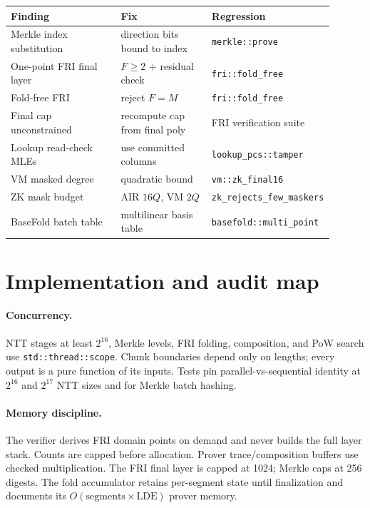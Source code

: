 \documentclass[11pt,a4paper]{article}
\begin{document}
\begin{longtable}{@{}L{0.34\linewidth}L{0.28\linewidth}L{0.28\linewidth}@{}}
\toprule
Finding & Fix & Regression \\
\midrule
\endhead
Merkle index substitution & direction bits bound to index & \texttt{merkle::prove} \\
One-point FRI final layer & $F\ge2$ + residual check & \texttt{fri::fold\_free} \\
Fold-free FRI & reject $F=M$ & \texttt{fri::fold\_free} \\
Final cap unconstrained & recompute cap from final poly & FRI verification suite \\
Lookup read-check MLEs & use committed columns & \texttt{lookup\_pcs::tamper} \\
VM masked degree & quadratic bound & \texttt{vm::zk\_final16} \\
ZK mask budget & AIR $16Q$, VM $2Q$ & \texttt{zk\_rejects\_few\_maskers} \\
BaseFold batch table & multilinear basis table & \texttt{basefold::multi\_point} \\
\bottomrule
\end{longtable}

\section{Implementation and audit map}

\paragraph{Concurrency.} NTT stages at least $2^{16}$, Merkle levels, FRI
folding, composition, and PoW search use \texttt{std::thread::scope}.
Chunk boundaries depend only on lengths; every output is a pure function of
its inputs. Tests pin parallel-vs-sequential identity at $2^{16}$ and
$2^{17}$ NTT sizes and for Merkle batch hashing.

\paragraph{Memory discipline.} The verifier derives FRI domain points on
demand and never builds the full layer stack. Counts are capped before
allocation. Prover trace/composition buffers use checked multiplication.
The FRI final layer is capped at 1024; Merkle caps at 256 digests. The fold
accumulator retains per-segment state until finalization and documents its
$O(\text{segments}\times\text{LDE})$ prover memory.
\end{document}
